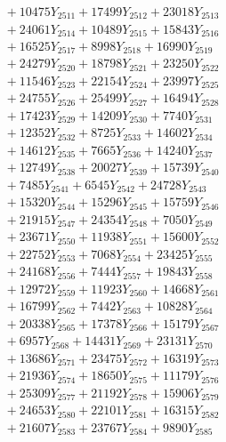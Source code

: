 \documentclass[a4paper,10pt]{article}
\begin{document}
{\begin{align}
&\;  + 10475 Y_{2511} + 17499 Y_{2512} + 23018 Y_{2513} \\[0.3ex]
&\;  + 24061 Y_{2514} + 10489 Y_{2515} + 15843 Y_{2516} \\[0.3ex]
&\;  + 16525 Y_{2517} + 8998 Y_{2518} + 16990 Y_{2519} \\[0.5ex]\allowbreak
&\;  + 24279 Y_{2520} + 18798 Y_{2521} + 23250 Y_{2522} \\[0.3ex]
&\;  + 11546 Y_{2523} + 22154 Y_{2524} + 23997 Y_{2525} \\[0.3ex]
&\;  + 24755 Y_{2526} + 25499 Y_{2527} + 16494 Y_{2528} \\[0.3ex]
&\;  + 17423 Y_{2529} + 14209 Y_{2530} + 7740 Y_{2531} \\[0.3ex]
&\;  + 12352 Y_{2532} + 8725 Y_{2533} + 14602 Y_{2534} \\[0.3ex]
&\;  + 14612 Y_{2535} + 7665 Y_{2536} + 14240 Y_{2537} \\[0.3ex]
&\;  + 12749 Y_{2538} + 20027 Y_{2539} + 15739 Y_{2540} \\[0.3ex]
&\;  + 7485 Y_{2541} + 6545 Y_{2542} + 24728 Y_{2543} \\[0.3ex]
&\;  + 15320 Y_{2544} + 15296 Y_{2545} + 15759 Y_{2546} \\[0.3ex]
&\;  + 21915 Y_{2547} + 24354 Y_{2548} + 7050 Y_{2549} \\[0.5ex]\allowbreak
&\;  + 23671 Y_{2550} + 11938 Y_{2551} + 15600 Y_{2552} \\[0.3ex]
&\;  + 22752 Y_{2553} + 7068 Y_{2554} + 23425 Y_{2555} \\[0.3ex]
&\;  + 24168 Y_{2556} + 7444 Y_{2557} + 19843 Y_{2558} \\[0.3ex]
&\;  + 12972 Y_{2559} + 11923 Y_{2560} + 14668 Y_{2561} \\[0.3ex]
&\;  + 16799 Y_{2562} + 7442 Y_{2563} + 10828 Y_{2564} \\[0.3ex]
&\;  + 20338 Y_{2565} + 17378 Y_{2566} + 15179 Y_{2567} \\[0.3ex]
&\;  + 6957 Y_{2568} + 14431 Y_{2569} + 23131 Y_{2570} \\[0.3ex]
&\;  + 13686 Y_{2571} + 23475 Y_{2572} + 16319 Y_{2573} \\[0.3ex]
&\;  + 21936 Y_{2574} + 18650 Y_{2575} + 11179 Y_{2576} \\[0.3ex]
&\;  + 25309 Y_{2577} + 21192 Y_{2578} + 15906 Y_{2579} \\[0.5ex]\allowbreak
&\;  + 24653 Y_{2580} + 22101 Y_{2581} + 16315 Y_{2582} \\[0.3ex]
&\;  + 21607 Y_{2583} + 23767 Y_{2584} + 9890 Y_{2585} \\[0.3ex]

\end{align}}
\end{document}
